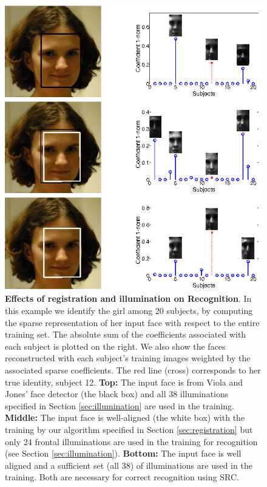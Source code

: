 \documentclass[10pt,journal,letterpaper,compsoc]{IEEEtran}
\begin{document}
\begin{figure}
\centering 
\includegraphics{Figure_1}
\caption{{\bf Effects of registration and illumination on
Recognition}. In this example we identify the girl among 20 subjects, by
computing the sparse representation of her input face with respect to the
entire training set. The absolute sum of the coefficients associated with each
subject is plotted on the right. We also show the faces reconstructed with each
subject's training images weighted by the associated sparse coefficients. The
red line (cross) corresponds to her true identity, subject 12. {\bf Top:} The
input face is from Viola and Jones' face detector (the black box) and all 38
illuminations specified in Section \ref{sec:illumination} are used in the
training.  {\bf Middle:} The input face is well-aligned (the white box) with
the training by our algorithm specified in Section \ref{sec:registration} but
only 24 frontal illuminations are used in the training for recognition (see
Section \ref{sec:illumination}). {\bf Bottom:} The input face is well aligned and
a sufficient set (all 38) of
illuminations are used in the training. Both are necessary for correct recognition
using SRC.}\label{fig:promo}
\vspace{-5mm}
\end{figure}
\end{document}
